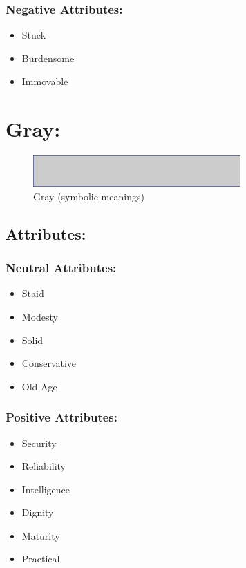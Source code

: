 \documentclass[openleft,oneside,showtrims]{memoir}
\begin{document}
\subsubsection*{Negative Attributes:}
\label{sec:org139b201}

\begin{itemize}
\item Stuck
\item Burdensome
\item Immovable
\end{itemize}

\section{Gray:}
\label{sec:orgf2d5a24}

\begin{figure}[htbp]
\centering
\includegraphics[width=300px]{./media/gray-banner.png}
\caption{\label{fig:HAP-WR-013}Gray (symbolic meanings)}
\end{figure}

\subsection{Attributes:}
\label{sec:org3edc582}

\subsubsection*{Neutral Attributes:}
\label{sec:org3562e0a}

\begin{itemize}
\item Staid
\item Modesty
\item Solid
\item Conservative
\item Old Age
\end{itemize}

\subsubsection*{Positive Attributes:}
\label{sec:orgb468e01}

\begin{itemize}
\item Security
\item Reliability
\item Intelligence
\item Dignity
\item Maturity
\item Practical
\end{itemize}
\end{document}
